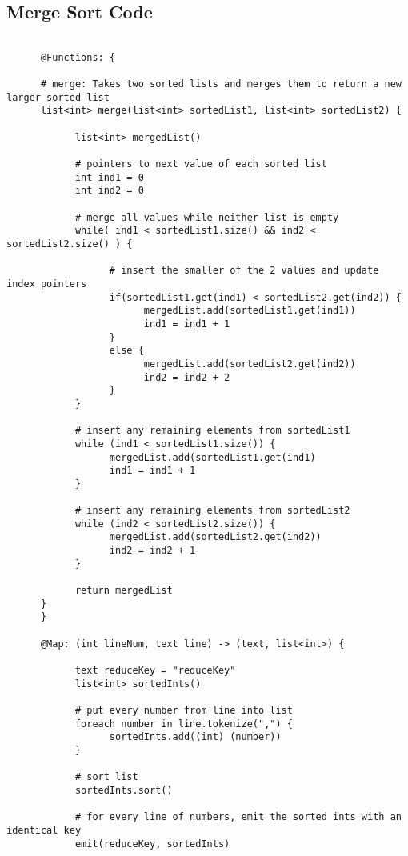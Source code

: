 \documentclass{article} \usepackage{fancyhdr, multicol}
\begin{document}
\subsection*{Merge Sort Code}
\begin{verbatim}
      
      @Functions: {
	  
      # merge: Takes two sorted lists and merges them to return a new larger sorted list
      list<int> merge(list<int> sortedList1, list<int> sortedList2) {
      	  
            list<int> mergedList()
	
            # pointers to next value of each sorted list
            int ind1 = 0
            int ind2 = 0

            # merge all values while neither list is empty
            while( ind1 < sortedList1.size() && ind2 < sortedList2.size() ) {

                  # insert the smaller of the 2 values and update index pointers
                  if(sortedList1.get(ind1) < sortedList2.get(ind2)) {
                        mergedList.add(sortedList1.get(ind1))
                        ind1 = ind1 + 1
                  }
                  else { 
                        mergedList.add(sortedList2.get(ind2))
                        ind2 = ind2 + 2
                  }
            }
            
            # insert any remaining elements from sortedList1
            while (ind1 < sortedList1.size()) {
                  mergedList.add(sortedList1.get(ind1)
		          ind1 = ind1 + 1
		    }
		
		    # insert any remaining elements from sortedList2
            while (ind2 < sortedList2.size()) {
                  mergedList.add(sortedList2.get(ind2))
		          ind2 = ind2 + 1
		    }
	        
	        return mergedList
      }
      }
      
      @Map: (int lineNum, text line) -> (text, list<int>) {

            text reduceKey = "reduceKey"
            list<int> sortedInts()
            
            # put every number from line into list
            foreach number in line.tokenize(",") {
                  sortedInts.add((int) (number))
            }
            
            # sort list
            sortedInts.sort()
            
            # for every line of numbers, emit the sorted ints with an identical key
            emit(reduceKey, sortedInts)
      

\end{verbatim}
\end{document}
